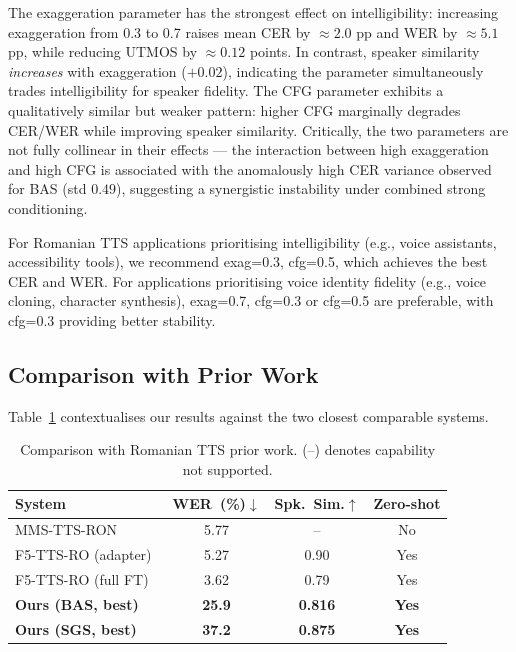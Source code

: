 \documentclass[conference]{IEEEtran}
\begin{document}
The exaggeration parameter has the strongest effect on intelligibility:
increasing exaggeration from 0.3 to 0.7 raises mean CER by $\approx2.0$ pp
and WER by $\approx5.1$ pp, while reducing UTMOS by $\approx0.12$ points.
In contrast, speaker similarity \emph{increases} with exaggeration
($+0.02$), indicating the parameter simultaneously trades intelligibility
for speaker fidelity.
The CFG parameter exhibits a qualitatively similar but weaker pattern:
higher CFG marginally degrades CER/WER while improving speaker
similarity.
Critically, the two parameters are not fully collinear in their
effects — the interaction between high exaggeration and high CFG is
associated with the anomalously high CER variance observed for BAS
(std $0.49$), suggesting a synergistic instability under combined
strong conditioning.

For Romanian TTS applications prioritising intelligibility (e.g.,
voice assistants, accessibility tools), we recommend exag=0.3,
cfg=0.5, which achieves the best CER and WER.
For applications prioritising voice identity fidelity (e.g., voice
cloning, character synthesis), exag=0.7, cfg=0.3 or cfg=0.5 are
preferable, with cfg=0.3 providing better stability.

\subsection{Comparison with Prior Work}

Table~\ref{tab:priorwork} contextualises our results against the
two closest comparable systems.

\begin{table}[h]
\centering
\caption{Comparison with Romanian TTS prior work.
  (--) denotes capability not supported.}
\label{tab:priorwork}
\begin{tabular}{lccc}
\toprule
System & WER~(\%)$\downarrow$ & Spk.~Sim.$\uparrow$ & Zero-shot \\
\midrule
MMS-TTS-RON~\cite{mms}            & 5.77  & --    & No  \\
F5-TTS-RO (adapter)~\cite{f5tts_ro} & 5.27  & 0.90  & Yes \\
F5-TTS-RO (full FT)~\cite{f5tts_ro} & 3.62  & 0.79  & Yes \\
\midrule
\textbf{Ours (BAS, best)} & \textbf{25.9} & \textbf{0.816} & \textbf{Yes} \\
\textbf{Ours (SGS, best)} & \textbf{37.2} & \textbf{0.875} & \textbf{Yes} \\
\bottomrule
\end{tabular}
\end{table}
\end{document}
